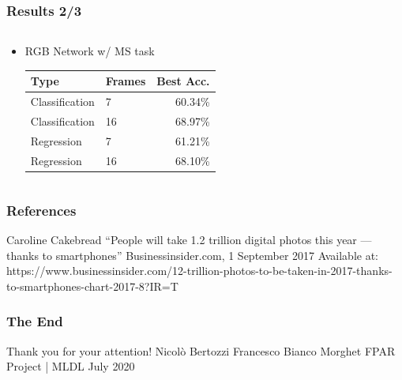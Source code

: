 \documentclass{beamer}
\begin{document}
\begin{frame}
	\frametitle{Results 2/3}
	
	{ \footnotesize 
	\begin{columns}
		\begin{column}{.75\textwidth}
			\begin{itemize}
				\item RGB Network w/ MS task
				\vspace{8pt}
				\begin{tabular}{ll|r}
					Type & Frames & Best Acc. \\
					\hline
					Classification & 7 & 60.34\% \\
					Classification & 16 & 68.97\% \\
					Regression & 7 & 61.21\% \\
					Regression & 16 & 68.10\% \\
				\end{tabular}
			\end{itemize}
		\end{column}
	\end{columns}
	}
	
\end{frame}
     
\begin{frame}
\frametitle{References}
   \begin{thebibliography}{9}
		Caroline Cakebread
		\newblock “People will take 1.2 trillion digital photos this year — thanks to smartphones”
		\newblock Businessinsider.com, 1 September 2017
		\newblock Available at: https://www.businessinsider.com/12-trillion-photos-to-be-taken-in-2017-thanks-to-smartphones-chart-2017-8?IR=T
   \end{thebibliography}
\end{frame}

\begin{frame}
\centering
\frametitle{The End}
\Huge Thank you for your attention!
\break
\break
\break
\break
\large Nicolò Bertozzi
\break
Francesco Bianco Morghet
\break
\break
FPAR Project | MLDL
 July 2020
\end{frame}
\end{document}
